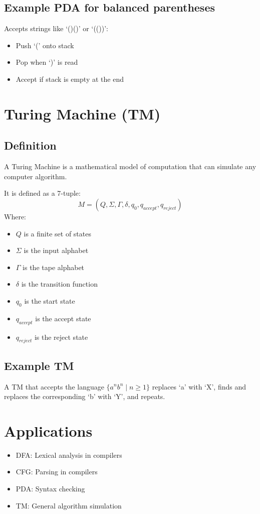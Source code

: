\documentclass[12pt]{article}
\begin{document}
\subsection{Example PDA for balanced parentheses}
Accepts strings like `()()' or `(())':
\begin{itemize}
    \item Push `(' onto stack
    \item Pop when `)' is read
    \item Accept if stack is empty at the end
\end{itemize}

\section{Turing Machine (TM)}
\subsection{Definition}
A Turing Machine is a mathematical model of computation that can simulate any computer algorithm.

It is defined as a 7-tuple:
\[ M = (Q, \Sigma, \Gamma, \delta, q_0, q_{accept}, q_{reject}) \]
Where:
\begin{itemize}
    \item $Q$ is a finite set of states
    \item $\Sigma$ is the input alphabet
    \item $\Gamma$ is the tape alphabet
    \item $\delta$ is the transition function
    \item $q_0$ is the start state
    \item $q_{accept}$ is the accept state
    \item $q_{reject}$ is the reject state
\end{itemize}

\subsection{Example TM}
A TM that accepts the language $\{a^nb^n \mid n \geq 1\}$ replaces `a' with `X', finds and replaces the corresponding `b' with `Y', and repeats.

\section{Applications}
\begin{itemize}
    \item DFA: Lexical analysis in compilers
    \item CFG: Parsing in compilers
    \item PDA: Syntax checking
    \item TM: General algorithm simulation
\end{itemize}
\end{document}
